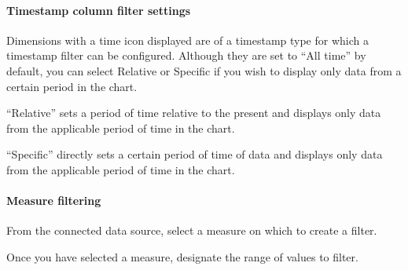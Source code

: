 \documentclass[letterpaper,10pt,english]{sphinxmanual}
\begin{document}
\paragraph{Timestamp column filter settings}
\label{\detokenize{discovery/part04/chart_filter:id6}}
Dimensions with a time icon displayed are of a timestamp type for which a timestamp filter can be configured. Although they are set to “All time” by default, you can select Relative or Specific if you wish to display only data from a certain period in the chart.

“Relative” sets a period of time relative to the present and displays only data from the applicable period of time in the chart.
\begin{quote}

\begin{figure}[H]
\centering

\noindent{}
\end{figure}
\end{quote}

“Specific” directly sets a certain period of time of data and displays only data from the applicable period of time in the chart.
\begin{quote}

\begin{figure}[H]
\centering

\noindent{}
\end{figure}
\end{quote}


\paragraph{Measure filtering}
\label{\detokenize{discovery/part04/chart_filter:id7}}
From the connected data source, select a measure on which to create a filter.
\begin{quote}

\begin{figure}[H]
\centering

\noindent{}
\end{figure}
\end{quote}

Once you have selected a measure, designate the range of values to filter.
\begin{quote}

\begin{figure}[H]
\centering

\noindent{}
\end{figure}
\end{quote}
\end{document}
